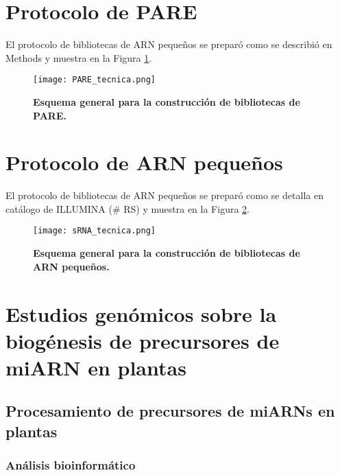 \section{Protocolo de PARE}

El protocolo de bibliotecas de ARN pequeños se preparó como se describió en Methods \citep{pmid23810899} y muestra en la Figura \ref{fig:PARE_tecnica}.

\begin{figure}[htbp!]
	\centering    
	\texttt{[image: PARE\_tecnica.png]}
	\caption[Esquema general para la construcción de bibliotecas de PARE]{
		\textbf{Esquema general para la construcción de bibliotecas de PARE.}
	}
	 \label{fig:PARE_tecnica}
\end{figure}


\section{Protocolo de ARN pequeños}

El protocolo de bibliotecas de ARN pequeños se preparó como se detalla en catálogo de ILLUMINA (\# RS) y muestra en la Figura \ref{fig:sRNA_tecnica}.

\begin{figure}[htbp!]
	\centering    
	\texttt{[image: sRNA\_tecnica.png]}
	\caption[Esquema general para la construcción de bibliotecas de ARN pequeños]{
		\textbf{Esquema general para la construcción de bibliotecas de ARN pequeños.}
	}
	 \label{fig:sRNA_tecnica}
\end{figure}


\section{Estudios genómicos sobre la biogénesis de precursores de miARN en plantas}

\subsection{Procesamiento de precursores de miARNs en plantas}

\subsubsection{Análisis bioinformático}\label{sec:estruc_sec}

